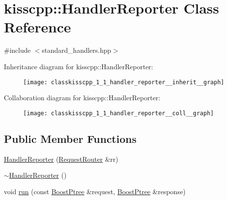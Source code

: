 \hypertarget{classkisscpp_1_1_handler_reporter}{\section{kisscpp\-:\-:Handler\-Reporter Class Reference}
\label{classkisscpp_1_1_handler_reporter}
}


{\ttfamily \#include $<$standard\-\_\-handlers.\-hpp$>$}



Inheritance diagram for kisscpp\-:\-:Handler\-Reporter\-:\nopagebreak
\begin{figure}[H]
\begin{center}
\leavevmode
\texttt{[image: classkisscpp\_1\_1\_handler\_reporter\_\_inherit\_\_graph]}
\end{center}
\end{figure}


Collaboration diagram for kisscpp\-:\-:Handler\-Reporter\-:\nopagebreak
\begin{figure}[H]
\begin{center}
\leavevmode
\texttt{[image: classkisscpp\_1\_1\_handler\_reporter\_\_coll\_\_graph]}
\end{center}
\end{figure}
\subsection*{Public Member Functions}
\begin{DoxyCompactItemize}
\item 
\hyperlink{classkisscpp_1_1_handler_reporter_a3453f6a6fa7a265c64d10703be4ba0bd}{Handler\-Reporter} (\hyperlink{classkisscpp_1_1_request_router}{Request\-Router} \&rr)
\item 
\hyperlink{classkisscpp_1_1_handler_reporter_a8fa462a342186238f7a3e956b936d9b4}{$\sim$\-Handler\-Reporter} ()
\item 
void \hyperlink{classkisscpp_1_1_handler_reporter_a5085be2e4dcfa1e98bf517c8d0b5443f}{run} (const \hyperlink{boost__ptree_8hpp_ab36820650b8e0db36402aea80485633c}{Boost\-Ptree} \&request, \hyperlink{boost__ptree_8hpp_ab36820650b8e0db36402aea80485633c}{Boost\-Ptree} \&response)
\end{DoxyCompactItemize}


